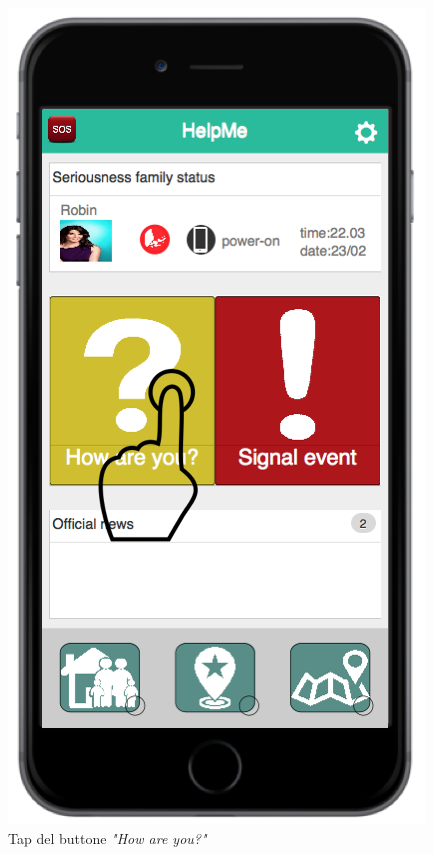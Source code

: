 \begin{itemize}
   \begin{figure}[H]
	\centering
	\includegraphics[scale=1]{interfaccia/tapbuttoncomestai.png}
	\caption{Tap del buttone \textit{"How are you?"}}
	\label{fig:buttoncomestai}
\end{figure}
   \begin{figure}[H]
	\centering

\end{figure}
\end{itemize}
